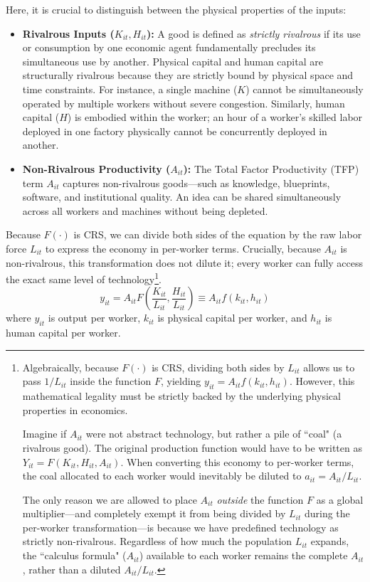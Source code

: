 Here, it is crucial to distinguish between the physical properties of the inputs:
\begin{itemize}
    \item \textbf{Rivalrous Inputs ($K_{it}, H_{it}$):} A good is defined as \textit{strictly rivalrous} if its use or consumption by one economic agent fundamentally precludes its simultaneous use by another. Physical capital and human capital are structurally rivalrous because they are strictly bound by physical space and time constraints. For instance, a single machine ($K$) cannot be simultaneously operated by multiple workers without severe congestion. Similarly, human capital ($H$) is embodied within the worker; an hour of a worker's skilled labor deployed in one factory physically cannot be concurrently deployed in another.
    \item \textbf{Non-Rivalrous Productivity ($A_{it}$):} The Total Factor Productivity (TFP) term $A_{it}$ captures non-rivalrous goods—such as knowledge, blueprints, software, and institutional quality. An idea can be shared simultaneously across all workers and machines without being depleted.
\end{itemize}

Because $F(\cdot)$ is CRS, we can divide both sides of the equation by the raw labor force $L_{it}$ to express the economy in per-worker terms. Crucially, because $A_{it}$ is non-rivalrous, this transformation does not dilute it; every worker can fully access the exact same level of technology\footnote{
    Algebraically, because $F(\cdot)$ is CRS, dividing both sides by $L_{it}$ allows us to pass $1/L_{it}$ inside the function $F$, yielding $y_{it} = A_{it} f(k_{it}, h_{it})$. However, this mathematical legality must be strictly backed by the underlying physical properties in economics. 
    
    Imagine if $A_{it}$ were not abstract technology, but rather a pile of ``coal" (a rivalrous good). The original production function would have to be written as $Y_{it} = F(K_{it}, H_{it}, A_{it})$. When converting this economy to per-worker terms, the coal allocated to each worker would inevitably be diluted to $a_{it} = A_{it}/L_{it}$. 
    
    The only reason we are allowed to place $A_{it}$ \textit{outside} the function $F$ as a global multiplier—and completely exempt it from being divided by $L_{it}$ during the per-worker transformation—is because we have predefined technology as strictly non-rivalrous. Regardless of how much the population $L_{it}$ expands, the ``calculus formula" ($A_{it}$) available to each worker remains the complete $A_{it}$, rather than a diluted $A_{it}/L_{it}$.
}.
$$
y_{it} = A_{it} F\left(\frac{K_{it}}{L_{it}}, \frac{H_{it}}{L_{it}}\right) \equiv A_{it} f(k_{it}, h_{it})
$$
where $y_{it}$ is output per worker, $k_{it}$ is physical capital per worker, and $h_{it}$ is human capital per worker.

